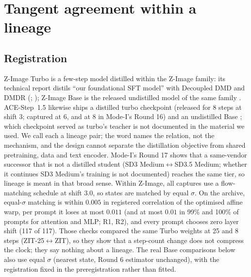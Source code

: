 \documentclass[11pt]{article}
\theoremstyle{definition}
\newcommand{\TT}{ZIT-25}%
\begin{document}
\section{Tangent agreement within a lineage}\label{sec:tangent}

\subsection{Registration}
Z-Image Turbo is a few-step model distilled within the Z-Image family: its technical report distils ``our foundational SFT model'' with Decoupled DMD and DMDR (\citealp[\S4.5 and Fig.~13]{zimageteam2025zimage}; \citealp{liu2025decoupled}); Z-Image Base is the released undistilled model of the same family \citep{tongyi2026zimage}. ACE-Step~1.5 likewise ships a distilled turbo checkpoint (released for 8 steps at shift 3; captured at 6, and at 8 in Mode-I's Round 16) and an undistilled Base \citep{gong2026acestep15}; which checkpoint served as turbo's teacher is not documented in the material we used. We call each a lineage pair; the word names the relation, not the mechanism, and the design cannot separate the distillation objective from shared pretraining, data and text encoder. Mode-I's Round 17 shows that a same-vendor successor that is not a distilled student (SD3 Medium$\leftrightarrow$SD3.5 Medium; whether it continues SD3 Medium's training is not documented) reaches the same tier, so lineage is meant in that broad sense. Within Z-Image, all captures use a flow-matching schedule at shift $3.0$, so states are matched by equal $\sigma$. On the archive, equal-$\sigma$ matching is within $0.005$ in registered correlation of the optimised affine warp, per prompt it loses at most $0.011$ (and at most $0.01$ in 99\% and 100\% of prompts for attention and MLP; R1, R2), and every prompt chooses zero layer shift (117 of 117). Those checks compared the same Turbo weights at 25 and 8 steps (\TT{}$\leftrightarrow$ZIT), so they show that a step-count change does not compress the clock; they say nothing about a lineage. The real Base comparisons below also use equal $\sigma$ (nearest state, Round 6 estimator unchanged), with the registration fixed in the preregistration rather than fitted.
\end{document}
